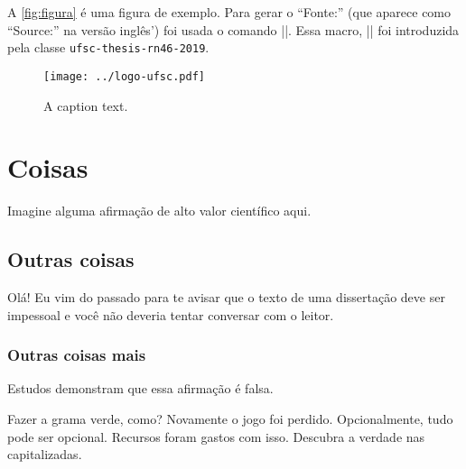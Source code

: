 A \autoref{fig:figura} é uma figura de exemplo. Para gerar o ``Fonte:'' (que aparece como ``Source:'' na versão inglês') foi usada o comando \mt||. Essa macro, \mt|\captionsource| foi introduzida pela classe \texttt{ufsc-thesis-rn46-2019}.

\begin{figure}[t]
  \centering
  \caption{\footnotesize A caption text.}
  \label{fig:figura}

  \texttt{[image: ../logo-ufsc.pdf]}
\end{figure}

\section{Coisas}
\label{sec:stuff}
Imagine alguma afirmação de alto valor científico aqui.

\subsection{Outras coisas}
\label{sec:more}
Olá! Eu vim do passado para te avisar que o texto de uma dissertação deve ser impessoal e você não deveria tentar conversar com o leitor. 

\subsubsection{Outras coisas mais}
\label{sec:yet-more}
Estudos demonstram que essa afirmação é falsa.

\label{sec:yet-another}
Fazer a grama verde, como? Novamente o jogo foi perdido. Opcionalmente, tudo pode ser opcional. Recursos foram gastos com isso. Descubra a verdade nas capitalizadas.
